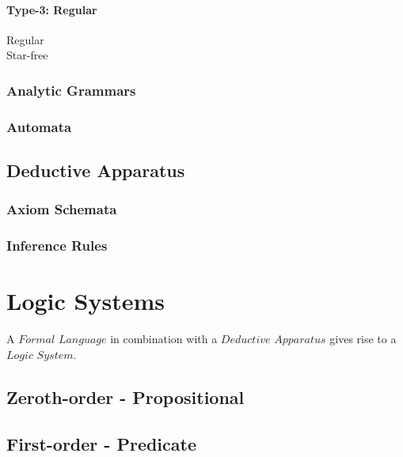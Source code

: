 \documentclass{article}
\begin{document}
\paragraph{Type-3: Regular}

    \begin{description}

    \item[Regular]

    \item[Star-free]

    \end{description}

\subsubsection{Analytic Grammars}

\subsubsection{Automata}

\subsection{Deductive Apparatus}

\subsubsection{Axiom Schemata}

\subsubsection{Inference Rules}

\section{Logic Systems}

A $Formal$ $Language$ in combination with a $Deductive$ $Apparatus$
gives rise to a $Logic$ $System$.

\subsection{Zeroth-order - Propositional}

\subsection{First-order - Predicate}
\end{document}
